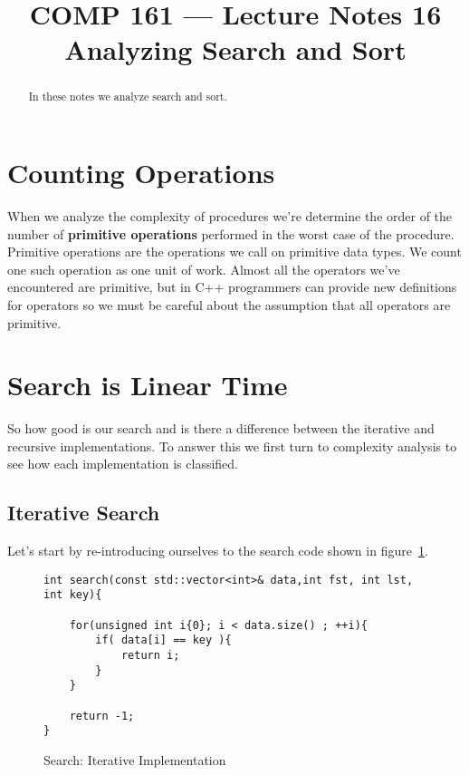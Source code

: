 \documentclass[]{tufte-handout}
\title{COMP 161 --- Lecture Notes 16 \\ Analyzing Search and Sort}
\date{}
\begin{document}
\maketitle

\begin{abstract}
In these notes we analyze search and sort.
\end{abstract}

\section{Counting Operations}

When we analyze the complexity of procedures we're determine the order of the number of \textbf{primitive operations} performed in the worst case of the procedure. Primitive operations are the operations we call on primitive data types. We count one such operation as one unit of work. Almost all the operators we've encountered are primitive, but in C++ programmers can provide new definitions for operators so we must be careful about the assumption that all operators are primitive.

\section{Search is Linear Time}

So how good is our search and is there a difference between the iterative and recursive implementations. To answer this we first turn to complexity analysis to see how each implementation is classified.

\subsection{Iterative Search}

Let's start by re-introducing ourselves to the search code shown in figure~\ref{code:searchiter}.
\begin{figure}[htpb!]
\begin{lstlisting}
int search(const std::vector<int>& data,int fst, int lst, int key){

    for(unsigned int i{0}; i < data.size() ; ++i){
    	if( data[i] == key ){
			return i;
		}
    }

    return -1;
}
\end{lstlisting}
\label{code:searchiter}
\caption{Search: Iterative Implementation}
\end{figure}
\end{document}
